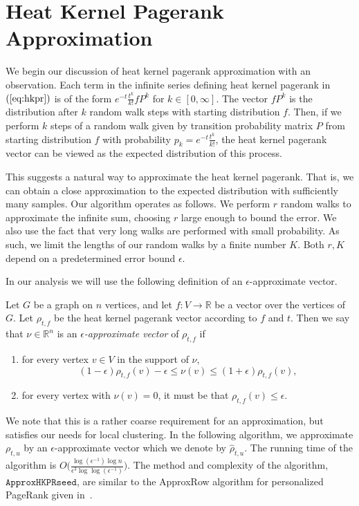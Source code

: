\documentclass[runningheads,a4paper]{llncs}
\newcommand{\R}{\mathbb{R}}
\newcommand{\hkprseedalg}{\texttt{ApproxHKPRseed}}
\newcommand{\hkprcomplexity}{O\big(\frac{\log(\epsilon^{-1})\log n}{\epsilon^3\log\log(\epsilon^{-1})}\big)}
\begin{document}
\section{Heat Kernel Pagerank Approximation}
\label{sec:hkprapprox}
We begin our discussion of heat kernel pagerank approximation with an
observation.  Each term in the infinite series defining heat kernel pagerank in
$(\ref{eq:hkpr})$ is of the form $e^{-t}\frac{t^k}{k!}fP^k$ for
$k\in[0,\infty]$.  The vector $fP^k$ is the distribution after $k$ random walk
steps with starting distribution $f$.  Then, if we perform $k$ steps of a random
walk given by transition probability matrix $P$ from starting distribution $f$
with probability $p_k = e^{-t}\frac{t^k}{k!}$, the heat kernel pagerank vector
can be viewed as the expected distribution of this process.

This suggests a natural way to approximate the heat kernel pagerank.  That is,
we can obtain a close approximation to the expected distribution with
sufficiently many samples.  Our algorithm operates as follows.  We perform $r$
random walks to approximate the infinite sum, choosing $r$ large enough to bound
the error.  We also use the fact that very long walks are performed with small
probability.  As such, we limit the lengths of our random walks by a finite
number $K$.  Both $r,K$ depend on a predetermined error bound $\epsilon$.

In our analysis we will use the following definition of an
$\epsilon$-approximate vector.

\begin{definition}
\label{def:eps-approx}
Let $G$ be a graph on $n$ vertices, and let $f:V\rightarrow \R$ be a vector over
the vertices of $G$.  Let $\rho_{t,f}$ be the heat kernel pagerank vector according
to $f$ and $t$.  Then we say that $\nu \in \R^n$ is an
\emph{$\epsilon$-approximate vector} of $\rho_{t,f}$ if
\begin{enumerate}
\item for every vertex $v \in V$ in the support of $\nu$, 
$$(1-\epsilon)\rho_{t,f}(v) -\epsilon \leq \nu(v) \leq (1+\epsilon)\rho_{t,f}(v),$$
\item for every vertex with $\nu(v) = 0$, it must be that $\rho_{t,f}(v) \leq \epsilon$.
\end{enumerate}
\end{definition}

We note that this is a rather coarse requirement for an approximation, but
satisfies our needs for local clustering.  In the following algorithm, we
approximate $\rho_{t,u}$ by an $\epsilon$-approximate vector which we denote by
$\hat{\rho}_{t,u}$.  The running time of the algorithm is $\hkprcomplexity$.  The
method and complexity of the algorithm, $\hkprseedalg$, are similar to the
ApproxRow algorithm for personalized PageRank given
in~\cite{bbct:sublinearpr:waw12}.
\end{document}
